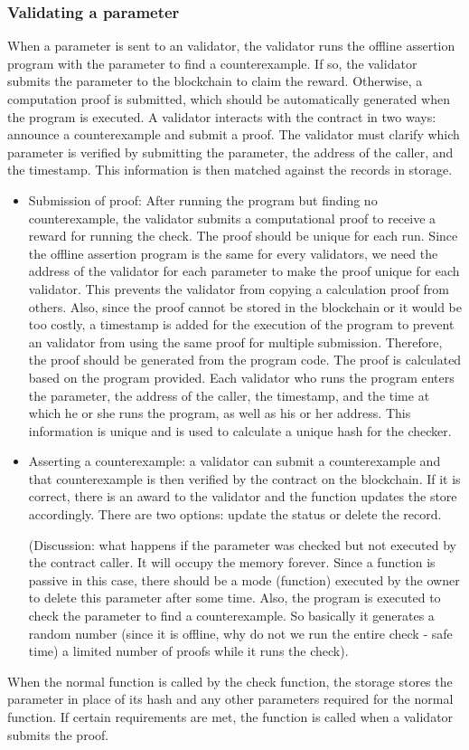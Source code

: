 \documentclass[runningheads]{llncs}
\begin{document}
\subsubsection{Validating a parameter}
When a parameter is sent to an validator, the validator runs the offline assertion program with the parameter to find a counterexample. If so, the validator submits the parameter to the blockchain to claim the reward. Otherwise, a computation proof is submitted, which should be automatically generated when the program is executed. A validator interacts with the contract in two ways: announce a counterexample  and submit a proof. The validator must clarify which parameter is verified by submitting the parameter, the address of the caller, and the timestamp. This information is then matched against the records in storage.

\begin{itemize}
\item Submission of proof: After running the program but finding no counterexample, the validator submits a computational proof to receive a reward for running the check. The proof should be unique for each run. Since the offline assertion program is the same for every validators, we need the address of the validator for each parameter to make the proof unique for each validator. This prevents the validator from copying a calculation proof from others. Also, since the proof cannot be stored in the blockchain or it would be too costly, a timestamp is added for the execution of the program to prevent an validator from using the same proof for multiple submission. Therefore, the proof should be generated from the program code. The proof is calculated based on the program provided. Each validator who runs the program enters the parameter, the address of the caller, the timestamp, and the time at which he or she runs the program, as well as his or her address. This information is unique and is used to calculate a unique hash for the checker.
\item Asserting a counterexample: a validator can submit a counterexample and that counterexample is then verified by the contract on the blockchain. If it is correct, there is an award to the validator and the function updates the store accordingly. There are two options: update the status or delete the record. 
 
(Discussion: what happens if the parameter was checked but not executed by the contract caller. It will occupy the memory forever. Since a function is passive in this case, there should be a mode (function) executed by the owner to delete this parameter after some time. Also, the program is executed to check the parameter to find a counterexample. So basically it generates a random number (since it is offline, why do not we run the entire check - safe time) a limited number of proofs while it runs the check).
\end{itemize}
When the normal function is called by the check function, the storage stores the parameter in place of its hash and any other parameters required for the normal function. If certain requirements are met, the function is called when a validator submits the proof.
\end{document}
